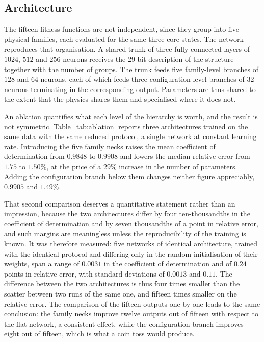 \documentclass{style/nseJournal}
\begin{document}
\subsection{Architecture}

The fifteen fitness functions are not independent, since they group into five
physical families, each evaluated for the same three core states. The network
reproduces that organisation. A shared trunk of three fully connected layers of
$1024$, $512$ and $256$ neurons receives the 29-bit description of the structure
together with the number of groups. The trunk feeds five family-level branches
of $128$ and $64$ neurons, each of which feeds three configuration-level
branches of $32$ neurons terminating in the corresponding output. Parameters are
thus shared to the extent that the physics shares them and specialised where it
does not.

An ablation quantifies what each level of the hierarchy is worth, and the result
is not symmetric. Table~\ref{tab:ablation} reports three architectures trained
on the same data with the same reduced protocol, a single network at constant
learning rate. Introducing the five family necks raises the mean coefficient of
determination from $0.9848$ to $0.9908$ and lowers the median relative error
from $1.75$ to $1.50\%$, at the price of a $29\%$ increase in the number of
parameters. Adding the configuration branch below them changes neither figure
appreciably, $0.9905$ and $1.49\%$.

That second comparison deserves a quantitative statement rather than an
impression, because the two architectures differ by four ten-thousandths in the
coefficient of determination and by seven thousandths of a point in relative
error, and such margins are meaningless unless the reproducibility of the
training is known. It was therefore measured: five networks of identical
architecture, trained with the identical protocol and differing only in the
random initialisation of their weights, span a range of $0.0031$ in the
coefficient of determination and of $0.24$ points in relative error, with
standard deviations of $0.0013$ and $0.11$. The difference between the two
architectures is thus four times smaller than the scatter between two runs of
the same one, and fifteen times smaller on the relative error. The comparison of
the fifteen outputs one by one leads to the same conclusion: the family necks
improve twelve outputs out of fifteen with respect to the flat network, a
consistent effect, while the configuration branch improves eight out of fifteen,
which is what a coin toss would produce.
\end{document}
